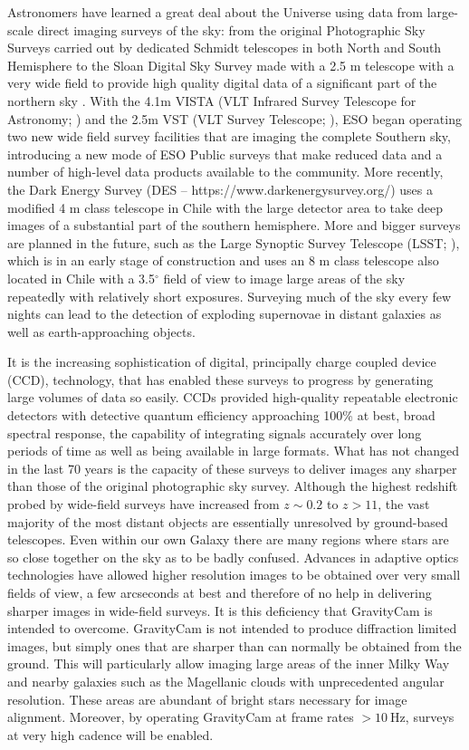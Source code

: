 \documentclass{pasa}%
\begin{document}
Astronomers have learned a great deal about the Universe using data from large-scale direct imaging surveys of the sky: from the original Photographic Sky Surveys carried out by dedicated Schmidt telescopes in both North and South Hemisphere \citep{Reid1993}  to the Sloan Digital Sky Survey made with a 2.5 m telescope with a very wide field to provide high quality digital data of a significant part of the northern sky \citep{Gunn+2006}. With the 4.1m VISTA (VLT Infrared Survey Telescope for Astronomy; \citealt{Emerson:VISTA}) and the 2.5m VST (VLT Survey Telescope; \citealt{VST}), ESO began operating two new wide field survey facilities  that are imaging the complete Southern sky, introducing a new mode of ESO Public surveys that make reduced data and a number of high-level data products available to the community. More recently, the Dark Energy Survey (DES -- https://www.darkenergysurvey.org/) uses a modified 4 m class telescope in Chile with the large detector area to take deep images of a substantial part of the southern hemisphere.  More and bigger surveys are planned in the future, such as the Large Synoptic Survey Telescope (LSST; \citealt{LSST}), which is in an early stage of construction and uses an 8 m class telescope also located in Chile with a 3.5$^\circ$ field of view to image large areas of the sky repeatedly with relatively short exposures.  Surveying much of the sky every few nights can lead to the detection of exploding supernovae in distant galaxies as well as earth-approaching objects.

It is the increasing sophistication of digital, principally charge coupled device (CCD), technology, that has enabled these surveys to progress by generating large volumes of data so easily.  CCDs provided high-quality repeatable electronic detectors with detective quantum efficiency approaching 100\% at best, broad spectral response, the capability of integrating signals accurately over long periods of time as well as being available in large formats.  What has not changed in the last 70 years is the capacity of these surveys to deliver images any sharper than those of the original photographic sky survey.  Although the highest redshift probed by wide-field surveys have increased from $z \sim 0.2$ to $z >11$, the vast majority of the most distant objects are essentially unresolved by ground-based telescopes.  Even within our own Galaxy there are many regions where stars are so close together on the sky as to be badly confused.  Advances in adaptive optics technologies have allowed higher resolution images to be obtained over very small fields of view, a few arcseconds at best and therefore of no help in delivering sharper images in wide-field surveys.  It is this deficiency that \mbox{GravityCam} is intended to overcome. \mbox{GravityCam} is not intended to produce diffraction limited images, but simply ones that are sharper than can normally be obtained from the ground. This will particularly allow imaging large areas of the inner Milky Way and nearby galaxies such as the Magellanic clouds with unprecedented angular resolution. These areas are abundant of bright stars necessary for image alignment. Moreover, by operating \mbox{GravityCam} at frame rates $> 10~\mbox{Hz}$, surveys at very high cadence will be enabled.
\end{document}
